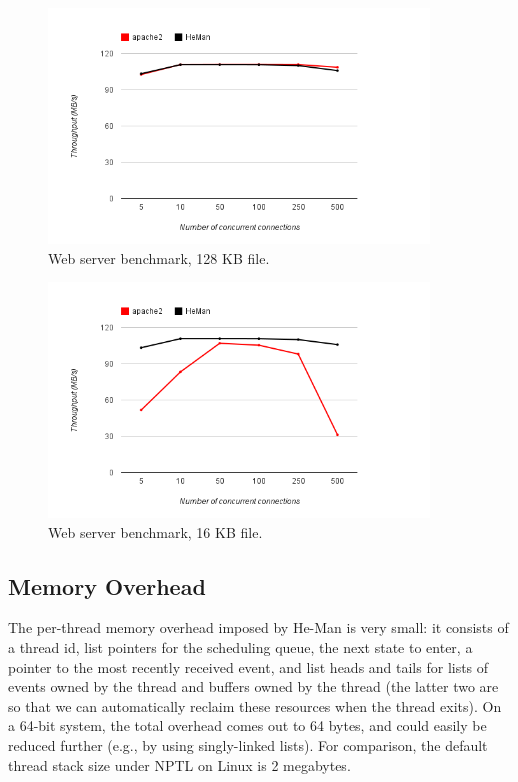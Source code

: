 \documentclass[preprint]{sigplanconf}
\begin{document}
\begin{figure}[!ht]
\centering
\includegraphics[width=0.9\textwidth]{128kb_graph.png}
\caption{Web server benchmark, 128 KB file.}
\label{fig:graph128}
\end{figure}
\begin{figure}[!ht]
\centering
\includegraphics[width=0.9\textwidth]{16kb_graph.png}
\caption{Web server benchmark, 16 KB file.}
\label{fig:graph16}
\end{figure}

\subsection{Memory Overhead}

The per-thread memory overhead imposed by He-Man is very small: it
consists of a thread id, list pointers for the scheduling queue, the
next state to enter, a pointer to the most recently received event,
and list heads and tails for lists of events owned by the thread and
buffers owned by the thread (the latter two are so that we can
automatically reclaim these resources when the thread exits). On a
64-bit system, the total overhead comes out to 64 bytes, and could
easily be reduced further (e.g., by using singly-linked lists).  For
comparison, the default thread stack size under NPTL on Linux is 2
megabytes.
\end{document}

